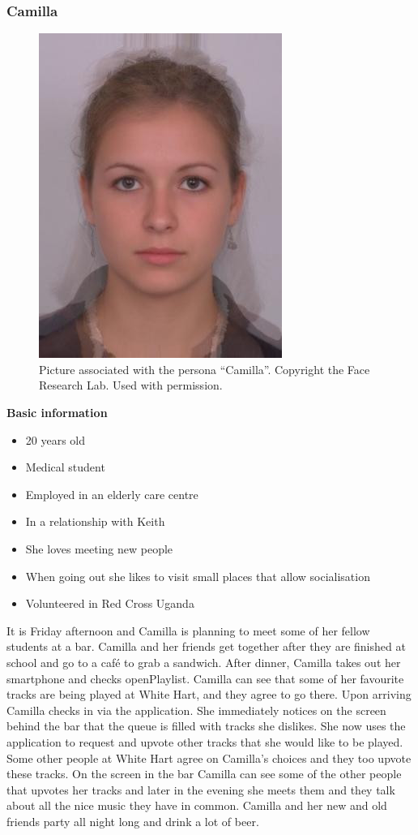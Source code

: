 \subsubsection{Camilla}
\begin{figure} [h]
  \centering
  \includegraphics[]{Images/camilla.jpg}
  \caption{Picture associated with the persona \enquote{Camilla}. Copyright the Face Research Lab. Used with permission.}
  \label{fig:camilla}
\end{figure}
\noindent\textbf{Basic information}
\begin{itemize}
\item 20 years old
\item Medical student
\item Employed in an elderly care centre
\item In a relationship with Keith
\item She loves meeting new people
\item When going out she likes to visit small places that allow socialisation
\item Volunteered in Red Cross Uganda
\end{itemize}

It is Friday afternoon and Camilla is planning to meet some of her fellow students at a bar. Camilla and her friends get together after they are finished at school and go to a café to grab a sandwich. After dinner, Camilla takes out her smartphone and checks openPlaylist. Camilla can see that some of her favourite tracks are being played at White Hart, and they agree to go there. Upon arriving Camilla checks in via the application. She immediately notices on the screen behind the bar that the queue is filled with tracks she dislikes. She now uses the application to request and upvote other tracks that she would like to be played. Some other people at White Hart agree on Camilla's choices and they too upvote these tracks. On the screen in the bar Camilla can see some of the other people that upvotes her tracks and later in the evening she meets them and they talk about all the nice music they have in common. Camilla and her new and old friends party all night long and drink a lot of beer.

